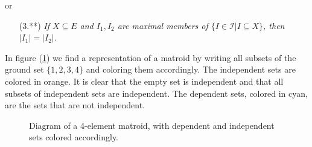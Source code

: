 or

\begin{enumerate}
\item[(3.**)] \textit{If $X \subseteq E$ and $I_1, I_2$ are maximal members of $\{ I \in \mathcal{I} | I \subseteq X \}$, then $|I_1| = |I_2|$.}
\end{enumerate}

\begin{exmp}
In  figure (\ref{fig:1234-matroid-independent-sets}) we find a representation of a matroid by writing all subsets of the ground set $\{1,2,3,4\}$ and coloring them accordingly. The independent sets are colored in orange. It is clear that the empty set is independent and that all subsets of independent sets are independent. The dependent sets, colored in cyan, are the sets that are not independent.
\end{exmp}


\begin{figure}[h]

\begin{center}
\end{center}
\caption{Diagram of a 4-element matroid, with dependent and independent sets colored accordingly.}
\label{fig:1234-matroid-independent-sets}
\end{figure}


